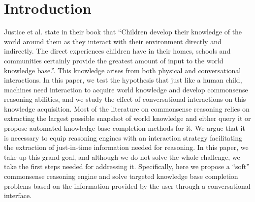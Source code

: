 \section{Introduction}
Justice et al. \cite{justiceguide} state in their book that ``Children develop their knowledge of the world around them as they interact with their environment directly and indirectly. The direct experiences children have in their homes, schools and communities certainly provide the greatest amount of input to the world knowledge base.''. This knowledge arises from both physical and conversational interactions. In this paper, we test the hypothesis that just like a human child, machines need interaction to acquire world knowledge and develop commonsense reasoning abilities, and we study the effect of conversational interactions on this knowledge acquisition. Most of the literature on commonsense reasoning 
relies %
on extracting the largest possible snapshot of 
world knowledge and either 
query %
it or 
propose %
automated knowledge base completion methods for it. We argue that it is necessary to equip reasoning engines with an interaction strategy facilitating the extraction of just-in-time information needed for reasoning. 
In this paper, we 
take up %
this grand goal, %
and although we do not solve the whole challenge, we take the first steps needed for addressing it. 
Specifically, here we propose a ``soft'' commonsense reasoning engine and solve targeted knowledge base completion problems based on the information provided by the user through a conversational interface.


